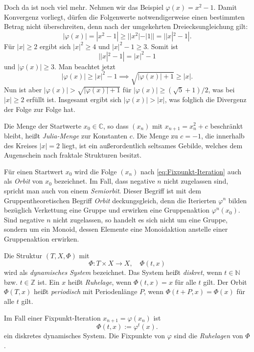 \documentclass[a4paper,11pt,fleqn,twoside]{scrartcl}
\numberwithin{equation}{section}
\newcommand{\N}{\mathbb N}
\newcommand{\Z}{\mathbb Z}
\newcommand{\C}{\mathbb C}
\newcommand{\strong}[1]{{\normalfont\sffamily\bfseries #1}}
\newenvironment{Definition}{\par\noindent\strong{Definition.}}{\par}
\begin{document}
Doch da ist noch viel mehr. Nehmen wir das Beispiel
$\varphi(x)=x^2-1$. Damit Konvergenz vorliegt, dürfen die Folgenwerte
notwendigerweise einen bestimmten Betrag nicht überschreiten, denn
nach der umgekehrten Dreiecksungleichung gilt:
\begin{equation}
|\varphi(x)| = |x^2-1| \ge ||x^2|-|1|| = ||x|^2-1|.
\end{equation}
Für $|x|\ge 2$ ergibt sich $|x|^2\ge 4$ und $|x|^2-1\ge 3$.
Somit ist
\begin{equation}
||x|^2-1| = |x|^2-1
\end{equation}
und $|\varphi(x)|\ge 3$.
Man beachtet jetzt
\begin{equation}
|\varphi(x)|\ge |x|^2-1 \implies \sqrt{|\varphi(x)|+1}\ge |x|.
\end{equation}
Nun ist aber $|\varphi(x)|>\sqrt{|\varphi(x)|+1}$ für
$|\varphi(x)|\ge (\sqrt{5}+1)/2$, was bei $|x|\ge 2$ erfüllt ist.
Insgesamt ergibt sich $|\varphi(x)|>|x|$, was folglich die Divergenz
der Folge zur Folge hat.

Die Menge der Startwerte $x_0\in\C$, so dass
$(x_n)$ mit $x_{n+1}=x_n^2+c$ beschränkt bleibt,
heißt \emph{Julia-Menge} zur Konstanten $c$. Die Menge zu $c=-1$,
die innerhalb des Kreises $|x|=2$ liegt, ist ein außerordentlich
seltsames Gebilde, welches dem Augenschein nach
fraktale Strukturen besitzt.

Für einen Startwert $x_0$ wird die Folge $(x_n)$ nach
\eqref{eq:Fixpunkt-Iteration} auch als \emph{Orbit}
von $x_0$ bezeichnet. Im Fall, dass negative $n$ nicht zugelassen
sind, spricht man auch von einem \emph{Semiorbit}. Dieser Begriff
ist mit dem Gruppentheoretischen Begriff \emph{Orbit} deckungsgleich,
denn die Iterierten $\varphi^n$ bilden bezüglich Verkettung
eine Gruppe und erwirken eine Gruppenaktion $\varphi^n(x_0)$.
Sind negative $n$ nicht zugelassen,
so handelt es sich nicht um eine Gruppe, sondern um ein Monoid,
dessen Elemente eine Monoidaktion anstelle einer Gruppenaktion
erwirken.

\begin{Definition}
Die Struktur $(T,X,\Phi)$ mit
\begin{equation}
\Phi\colon T\times X\to X,\quad\Phi(t,x)
\end{equation}
wird als \emph{dynamisches System} bezeichnet. Das System heißt
\emph{diskret}, wenn $t\in\N$ bzw. $t\in\Z$ ist. Ein $x$ heißt
\emph{Ruhelage}, wenn $\Phi(t,x)=x$ für alle $t$ gilt. Der Orbit $\Phi(T,x)$
heißt \emph{periodisch} mit Periodenlänge $P$, wenn $\Phi(t+P,x)=\Phi(x)$
für alle $t$ gilt. 
\end{Definition}
Im Fall einer Fixpunkt-Iteration $x_{n+1}=\varphi(x_n)$ ist
\begin{equation}
\Phi(t,x):=\varphi^t(x).
\end{equation}
ein diskretes dynamisches System. Die Fixpunkte von $\varphi$ sind
die \emph{Ruhelagen} von $\Phi$.
\end{document}
